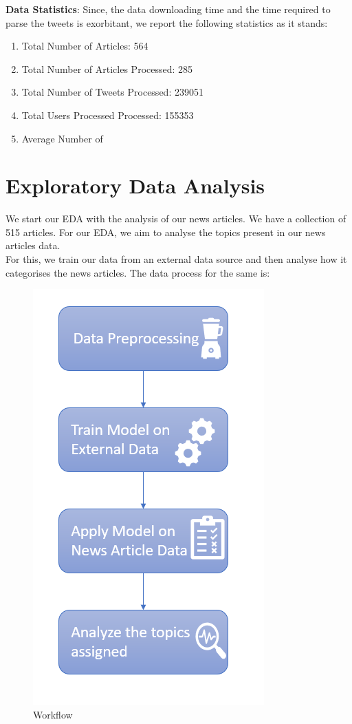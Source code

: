 \documentclass{article}
\begin{document}
\textbf{Data Statistics}:
Since, the data downloading time and the time required to parse the tweets is exorbitant, we report the following statistics as it stands:
\begin{enumerate}
    \item Total Number of Articles: 564
    \item Total Number of Articles Processed: 285
    \item Total Number of Tweets Processed: 239051
    \item Total Users Processed Processed: 155353
    \item Average Number of 
\end{enumerate}





\section{Exploratory Data Analysis}

We start our EDA with the analysis of our news articles. We have a collection of 515 articles. For our EDA, we aim to analyse the topics present in our news articles data. \\
 For this, we train our data from an external data source and then analyse how it categorises the news articles. The data process for the same is: \\

    

\begin{figure}[H]
\centering
\includegraphics[scale=1]{lda_eda_process.PNG}

\caption{Workflow}
\end{figure}
\end{document}
